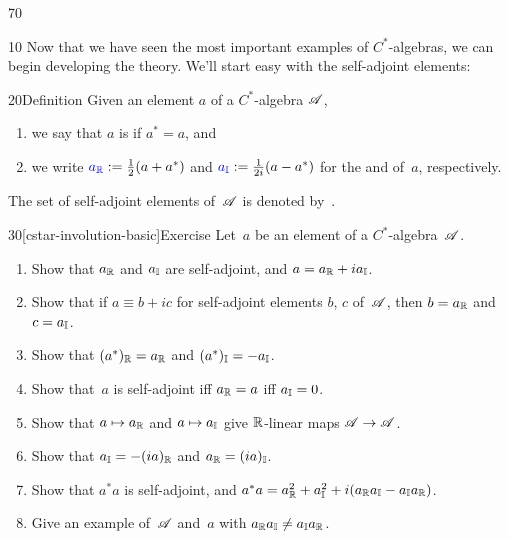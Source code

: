 \begin{parsec}{70}%
\begin{point}{10}%
Now that we have seen the most important examples
of $C^*$-algebras,
we can begin developing the theory.
We'll start easy with the self-adjoint elements:
\end{point}
\begin{point}{20}{Definition}%
Given an element $a$ of a $C^*$-algebra $\mathscr{A}$, 
\begin{enumerate}
\item we say that $a$ is %
 if $a^* =a$, and
\item we write $\Define{\Real{a}}:= \frac{1}{2}(a+a^*)$
and $\Define{\Imag{a}}:=\frac{1}{2i}(a-a^*)$
for the  and %
%
%
%
of~$a$, respectively.
\end{enumerate}
The set of self-adjoint elements of~$\mathscr{A}$
is denoted by~\Define{$\sa{\scrA}$}.%
\end{point}
\begin{point}{30}[cstar-involution-basic]{Exercise}%
Let~$a$ be an element of a $C^*$-algebra~$\mathscr{A}$.
\begin{enumerate}
\item 
Show that $a_{\mathbb{R}}$ and $a_{\mathbb{I}}$ are self-adjoint,
and  $a= a_{\mathbb{R}}+ia_{\mathbb{I}}$.
\item
Show that if $a\equiv b+ic$ for self-adjoint elements $b$, $c$ of~$\mathscr{A}$,
then $b=a_{\mathbb{R}}$ and~$c=a_{\mathbb{I}}$.
\item
Show that $(a^*)_{\mathbb{R}}=a_{\mathbb{R}}$ and $(a^*)_{\mathbb{I}}=-a_{\mathbb{I}}$.
\item 
Show that~$a$ is self-adjoint iff $a_{\mathbb{R}}=a$ iff $a_{\mathbb{I}}=0$.
\item
Show that $a\mapsto a_{\mathbb{R}}$ and $a\mapsto a_{\mathbb{I}}$
give $\mathbb{R}$-linear maps $\mathscr{A}\to\mathscr{A}$.
\item
Show that $a_{\mathbb{I}} = -(ia)_{\mathbb{R}}$ and $a_{\mathbb{R}}=(ia)_{\mathbb{I}}$.
\item
Show that $a^*a$ is self-adjoint,
and  $a^*a=a_{\mathbb{R}}^2+a_{\mathbb{I}}^2+i(a_{\mathbb{R}}a_{\mathbb{I}}-a_{\mathbb{I}}a_{\mathbb{R}})$.
\item
Give an example of~$\mathscr{A}$ and~$a$ 
with  $a_{\mathbb{R}}a_{\mathbb{I}} \neq a_{\mathbb{I}}a_{\mathbb{R}}$.


\end{enumerate}
\end{point}
\end{parsec}
